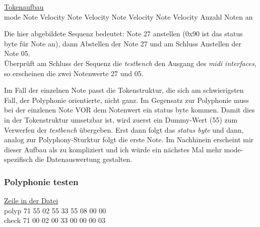 \underline{Tokenaufbau}\\
mode	\hspace{2mm} Note \hspace*{2mm} 	Velocity	\hspace*{2mm} Note \hspace*{2mm}  Velocity \hspace*{2mm} 	Note \hspace*{2mm} 	Velocity \hspace*{2mm} 	Note \hspace*{2mm} 	Velocity \hspace*{2mm}  Anzahl Noten an

Die hier abgebildete Sequenz bedeutet: Note 27 anstellen (0x90 ist das status byte für Note an), dann Abstellen der Note 27 und am Schluss Anstellen der Note 05. \\
Überprüft am Schluss der Sequenz die \textit{testbench} den Ausgang des \textit{midi interfaces}, so erscheinen die zwei Notenwerte 27 und 05.

Im Fall der einzelnen Note passt die Tokenstruktur, die sich am schwierigsten Fall, der Polyphonie orientierte, nicht ganz. Im Gegensatz zur Polyphonie muss bei der einzlenen Note VOR dem Notenwert ein status byte kommen. Damit dies in der Tokenstruktur umsetzbar ist, wird zuerst ein Dummy-Wert (55) zum Verwerfen der \textit{testbench} übergeben. Erst dann folgt das \textit{status byte} und dann, analog zur Polyphony-Sturktur folgt die erste Note. Im Nachhinein erscheint mir dieser Aufbau als zu kompliziert und ich würde ein nächstes Mal mehr mode-spezifisch die Datenauswertung gestalten.




\subsubsection{Polyphonie testen }

\underline{Zeile in der Datei}\\
polyp \hspace*{2mm} 71 \hspace*{4mm} 55 \hspace*{12mm}  02 \hspace*{6mm} 55 \hspace*{10mm} 33 \hspace*{6mm} 55 \hspace*{10mm} 08 \hspace*{6mm} 00 \hspace*{12mm} 00\\
check \hspace*{2mm} 71 \hspace*{4mm} 00 \hspace*{12mm}  02 \hspace*{6mm} 00 \hspace*{10mm} 33 \hspace*{6mm} 00 \hspace*{10mm} 00 \hspace*{6mm} 00 \hspace*{12mm} 03\\


